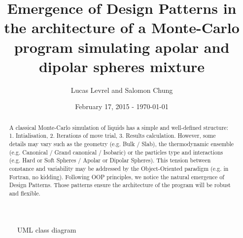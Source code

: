 \documentclass{article}
\title{Emergence of Design Patterns in the architecture of a Monte-Carlo program
    simulating apolar and dipolar spheres mixture}
\author{Lucas Levrel and Salomon Chung}
\date{February 17, 2015 - \today{}}
\begin{document}
    \maketitle

    \begin{abstract}
        A classical Monte-Carlo simulation of liquids has a simple and well-defined structure:
        1. Intialisation, 2. Iterations of move trial, 3. Results calculation.
        However, some details may vary such as the geometry (e.g. Bulk / Slab),
        the thermodynamic ensemble (e.g. Canonical / Grand canonical / Isobaric)
        or the particles type and interactions (e.g. Hard or Soft Spheres /
        Apolar or Dipolar Spheres).
        This tension between constance and variability may be addressed by
        the Object-Oriented paradigm (e.g. in Fortran, no kidding).
        Following OOP principles, we notice the natural emergence of Design Patterns.
        Those patterns ensure the architecture of the program will be robust and flexible.
    \end{abstract}

    \begin{figure}[htb]
        \centering
        
        \caption{UML class diagram}
    \end{figure}
\end{document}
